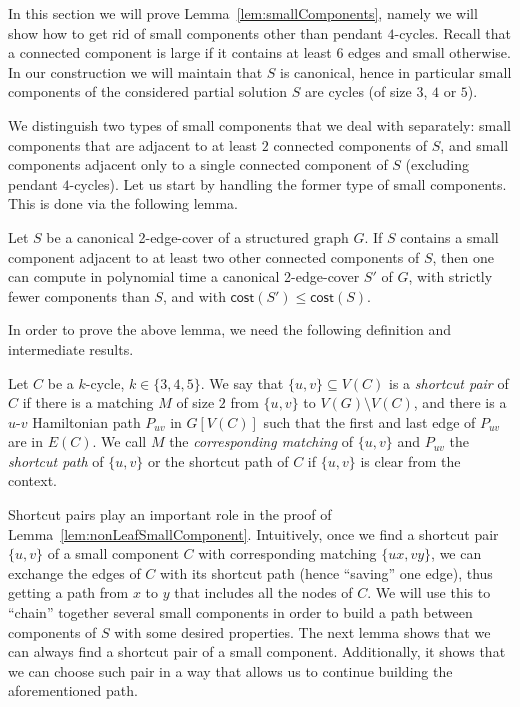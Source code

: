 \documentclass{article}
\newcommand{\cost}{\mathsf{cost}}
\begin{document}
In this section we will prove Lemma~\ref{lem:smallComponents}, namely we will show how to get rid of small components other than pendant $4$-cycles. Recall that a connected component is large if it contains at least 6 edges and small otherwise. In our construction we will maintain that $S$ is canonical, hence in particular small components of the considered partial solution $S$ are cycles (of size $3$, $4$ or $5$).

We distinguish two types of small components that we deal with separately: small components that are adjacent to at least $2$ connected components of $S$, and small components adjacent only to a single connected component of $S$ (excluding pendant $4$-cycles). Let us start by handling the former type of small components. This is done via the following lemma.
\begin{lemma}\label{lem:nonLeafSmallComponent}
     Let $S$ be a canonical 2-edge-cover of a structured graph $G$. If $S$ contains a small component adjacent to at least two other connected components of $S$, then one can compute in polynomial time a canonical 2-edge-cover $S'$ of $G$, with strictly fewer components than $S$, and with $\cost(S')\leq \cost(S)$.
\end{lemma}
In order to prove the above lemma, we need the following definition and intermediate results.
 
\begin{definition}\label{def:shortcutPair}
     Let $C$ be a $k$-cycle, $k\in \{3,4,5\}$. We say that $\{u,v\}\subseteq V(C)$ is a \emph{shortcut pair} of $C$ if there is a matching $M$ of size $2$ from $\{u,v\}$ to $V(G)\setminus V(C)$, and there is a $u$-$v$ Hamiltonian path $P_{uv}$ in $G[V(C)]$ such that the first and last edge of $P_{uv}$ are in $E(C)$. We call $M$ the \emph{corresponding matching} of $\{u,v\}$ and $P_{uv}$ the \emph{shortcut path} of $\{u,v\}$ or the shortcut path of $C$ if $\{u,v\}$ is clear from the context.
\end{definition}

Shortcut pairs play an important role in the proof of Lemma~\ref{lem:nonLeafSmallComponent}. Intuitively, once we find a shortcut pair $\{u, v\}$ of a small component $C$ with corresponding matching $\{ux, vy\}$, we can exchange the edges of $C$ with its shortcut path (hence ``saving'' one edge), thus getting a path from $x$ to $y$ that includes all the nodes of $C$. We will use this to ``chain'' together several small components in order to build a path between components of $S$ with some desired properties. The next lemma shows that we can always find a shortcut pair of a small component. Additionally, it shows that we can choose such pair in a way that allows us to continue building the aforementioned path.
\end{document}
